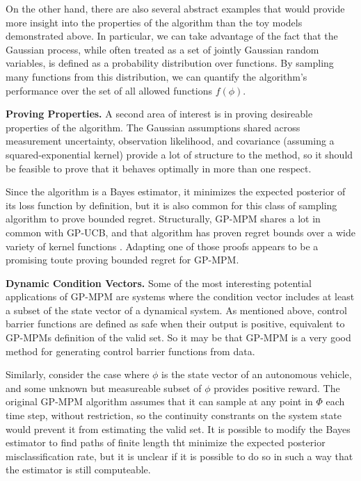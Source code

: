 \documentclass[12pt, conference]{IEEEtran}
\begin{document}
On the other hand, there are also several abstract examples that would provide more insight into the properties of the algorithm than the toy models demonstrated above. In particular, we can take advantage of the fact that the Gaussian process, while often treated as a set of jointly Gaussian random variables, is defined as a probability distribution over functions. By sampling many functions from this distribution, we can quantify the algorithm's performance over the set of all allowed functions $f(\phi)$.

\noindent\textbf{Proving Properties.} A second area of interest is in proving desireable properties of the algorithm. The Gaussian assumptions shared across measurement uncertainty, observation likelihood, and covariance (assuming a squared-exponential kernel) provide a lot of structure to the method, so it should be feasible to prove that it behaves optimally in more than one respect.

Since the algorithm is a Bayes estimator, it minimizes the expected posterior of its loss function by definition, but it is also common for this class of sampling algorithm to prove bounded regret. Structurally, GP-MPM shares a lot in common with GP-UCB, and that algorithm has proven regret bounds over a wide variety of kernel functions \cite{srinivas09}. Adapting one of those proofs appears to be a promising toute proving bounded regret for GP-MPM. 

\noindent\textbf{Dynamic Condition Vectors.} Some of the most interesting potential applications of GP-MPM are systems where the condition vector includes at least a subset of the state vector of a dynamical system. As mentioned above, control barrier functions are defined as safe when their output is positive, equivalent to GP-MPMs definition of the valid set. So it may be that GP-MPM is a very good method for generating control barrier functions from data.

Similarly, consider the case where $\phi$ is the state vector of an autonomous vehicle, and some unknown but measureable subset of $\phi$ provides positive reward. The original GP-MPM algorithm assumes that it can sample at any point in $\Phi$ each time step, without restriction, so the continuity constrants on the system state would prevent it from estimating the valid set. It is possible to modify the Bayes estimator to find paths of finite length tht minimize the expected posterior misclassification rate, but it is unclear if it is possible to do so in such a way that the estimator is still computeable.
\end{document}
